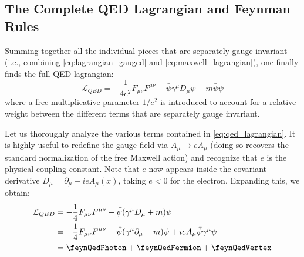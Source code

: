 \subsection{The Complete QED Lagrangian and Feynman Rules}

Summing together all the individual pieces that are separately gauge invariant (i.e., combining \eqref{eq:lagrangian_gauged} and \eqref{eq:maxwell_lagrangian}), one finally finds the full QED lagrangian:
\begin{equation} \label{eq:qed_lagrangian}
    \boxed{\mathcal{L}_{QED} = -\frac{1}{4e^2}F_{\mu\nu}F^{\mu\nu} - \bar{\psi}\gamma^\mu D_\mu\psi - m\bar{\psi}\psi}
\end{equation}
where a free multiplicative parameter \(1/e^2\) is introduced to account for a relative weight between the different terms that are separately gauge invariant.

Let us thoroughly analyze the various terms contained in \eqref{eq:qed_lagrangian}. It is highly useful to redefine the gauge field via \(A_\mu \rightarrow eA_\mu\) (doing so recovers the standard normalization of the free Maxwell action) and recognize that \(e\) is the physical coupling constant. Note that \(e\) now appears inside the covariant derivative \(D_\mu = \partial_\mu - ieA_\mu(x)\), taking \(e < 0\) for the electron. Expanding this, we obtain:
\begin{equation} \label{eq:qed_expanded}
    \begin{aligned}
        \mathcal{L}_{QED} & = -\frac{1}{4}F_{\mu\nu}F^{\mu\nu} - \bar{\psi}(\gamma^\mu D_\mu + m)\psi \nonumber                               \\
                          & = -\frac{1}{4}F_{\mu\nu}F^{\mu\nu} - \bar{\psi}(\gamma^\mu\partial_\mu + m)\psi + ieA_\mu\bar{\psi}\gamma^\mu\psi \\
                          & = \feynQedPhoton + \feynQedFermion + \feynQedVertex
    \end{aligned}
\end{equation}

